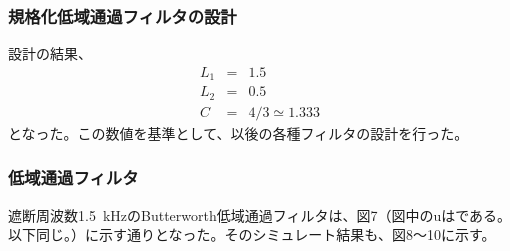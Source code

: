\documentclass[10pt,a4j,dvipdfmx]{jsarticle}
\begin{document}
\subsubsection{規格化低域通過フィルタの設計}
設計の結果、
\begin{eqnarray}
L_1 &=& 1.5 \\
L_2 &=& 0.5 \\
C &=& 4/3 \simeq 1.333
\end{eqnarray}
となった。この数値を基準として、以後の各種フィルタの設計を行った。

\subsubsection{低域通過フィルタ}
遮断周波数\SI{1.5}{\kilo\hertz}のButterworth低域通過フィルタは、図7（図中のuは\si{\micro}である。以下同じ。）に示す通りとなった。そのシミュレート結果も、図8〜10に示す。
\end{document}
